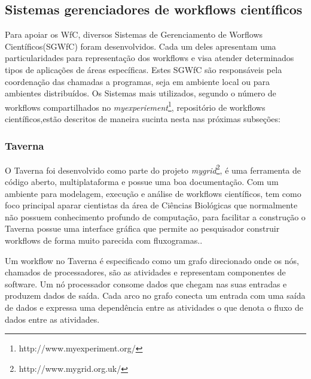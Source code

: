 	\subsection{Sistemas gerenciadores de workflows científicos}

		Para apoiar os WfC, diversos Sistemas de Gerenciamento de Worflows Científicos(SGWfC) foram desenvolvidos. Cada um deles apresentam uma particularidades para representação dos workflows e visa atender determinados tipos de aplicações de áreas específicas. Estes SGWfC são responsáveis pela coordenação das chamadas a programas, seja em ambiente local ou para ambientes distribuídos\cite{Ogasawara2011}. Os Sistemas mais utilizados, segundo o número de workflows compartilhados no \textit{myexperiement}\footnote{http://www.myexperiment.org/}, repositório de workflows científicos,estão descritos de maneira sucinta nesta nas próximas subseções:
		

		
		
		

		\subsubsection{Taverna}

				O Taverna foi desenvolvido como parte do projeto \textit{mygrid}\footnote{http://www.mygrid.org.uk/}, é uma ferramenta de código aberto, multiplataforma e possue uma boa documentação. Com um ambiente para modelagem, execução e análise de workflows científicos, tem como foco principal aparar cientistas da área de Ciências Biológicas que normalmente não possuem conhecimento profundo de computação, para facilitar a construção o Taverna possue uma interface gráfica que permite ao pesquisador construir workflows de forma muito parecida com fluxogramas.\cite{Teixeira2013}.

				Um workflow no Taverna é especificado como um grafo direcionado onde os nós, chamados de processadores,  são as atividades e representam componentes de software. Um nó processador consome dados que chegam nas suas entradas e produzem dados de saída. Cada arco no grafo conecta um entrada com uma saída de dados e expressa uma dependência entre as atividades o que denota o fluxo de dados entre as atividades\cite{Teixeira2013}.
				
